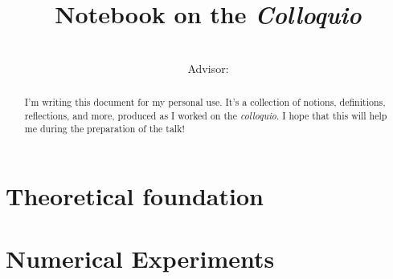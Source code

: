 \documentclass[]{article}
\title{
  {\Huge Notebook on the \textit{Colloquio}} \\
  \colloquioTitle
}
\author{
  \myFullName \\
  {\small Advisor: \advisorFullName}
}
\begin{document}
  \maketitle
  \begin{abstract}
    I'm writing this document for my personal use. It's a collection of notions,
    definitions, reflections, and more, produced as I worked on the \textit{colloquio}.
    I hope that this will help me during the preparation of the talk!
  \end{abstract}
  \tableofcontents
  \clearpage
  
  \part{Theoretical foundation}
  
  
  
  
  \clearpage
  \part{Numerical Experiments}
    
  \clearpage
  \printbibliography
\end{document}
